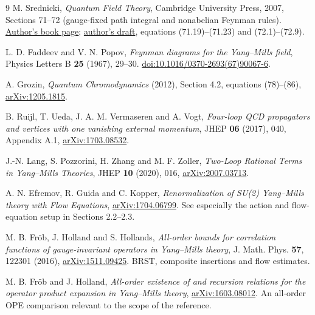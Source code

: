 \documentclass[11pt]{article}
\begin{document}
\begin{thebibliography}{9}
M. Srednicki, \emph{Quantum Field Theory}, Cambridge University Press, 2007,
Sections 71--72 (gauge-fixed path integral and nonabelian Feynman rules).
\href{https://web.physics.ucsb.edu/~mark/qft.html}{Author's book page};
\href{https://web.physics.ucsb.edu/~mark/ms-qft-DRAFT.pdf}{author's draft},
equations (71.19)--(71.23) and (72.1)--(72.9).

L. D. Faddeev and V. N. Popov,
\emph{Feynman diagrams for the Yang--Mills field},
Physics Letters B \textbf{25} (1967), 29--30.
\href{https://doi.org/10.1016/0370-2693(67)90067-6}{doi:10.1016/0370-2693(67)90067-6}.

A. Grozin, \emph{Quantum Chromodynamics} (2012), Section 4.2,
equations (78)--(86), \href{https://arxiv.org/abs/1205.1815}{arXiv:1205.1815}.

B. Ruijl, T. Ueda, J. A. M. Vermaseren and A. Vogt,
\emph{Four-loop QCD propagators and vertices with one vanishing external momentum},
JHEP \textbf{06} (2017), 040, Appendix A.1,
\href{https://arxiv.org/abs/1703.08532}{arXiv:1703.08532}.

J.-N. Lang, S. Pozzorini, H. Zhang and M. F. Zoller,
\emph{Two-Loop Rational Terms in Yang--Mills Theories},
JHEP \textbf{10} (2020), 016,
\href{https://arxiv.org/abs/2007.03713}{arXiv:2007.03713}.

A. N. Efremov, R. Guida and C. Kopper,
\emph{Renormalization of SU(2) Yang--Mills theory with Flow Equations},
\href{https://arxiv.org/abs/1704.06799}{arXiv:1704.06799}.
See especially the action and flow-equation setup in Sections 2.2--2.3.

M. B. Fr\"ob, J. Holland and S. Hollands,
\emph{All-order bounds for correlation functions of gauge-invariant
operators in Yang--Mills theory}, J. Math. Phys. \textbf{57}, 122301 (2016),
\href{https://arxiv.org/abs/1511.09425}{arXiv:1511.09425}.
BRST, composite insertions and flow estimates.

M. B. Fr\"ob and J. Holland,
\emph{All-order existence of and recursion relations for the operator
product expansion in Yang--Mills theory},
\href{https://arxiv.org/abs/1603.08012}{arXiv:1603.08012}.
An all-order OPE comparison relevant to the scope of the reference.
\end{thebibliography}
\endgroup
\end{document}
